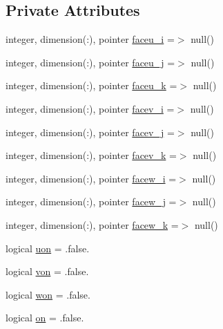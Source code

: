 \subsection*{Private Attributes}
\begin{DoxyCompactItemize}
\item 
integer, dimension(\+:), pointer \mbox{\hyperlink{structmodulehydrodynamic_1_1t__thinwalls_a0a7f7ad052a76885bd8609b41dea27d5}{faceu\+\_\+i}} =$>$ null()
\item 
integer, dimension(\+:), pointer \mbox{\hyperlink{structmodulehydrodynamic_1_1t__thinwalls_ae196e7ae2104e91f81df9984c74ae733}{faceu\+\_\+j}} =$>$ null()
\item 
integer, dimension(\+:), pointer \mbox{\hyperlink{structmodulehydrodynamic_1_1t__thinwalls_a2858acc4e056d5474ff44e85604df4b5}{faceu\+\_\+k}} =$>$ null()
\item 
integer, dimension(\+:), pointer \mbox{\hyperlink{structmodulehydrodynamic_1_1t__thinwalls_ae4cf7b842e83d0697fe416873188abc2}{facev\+\_\+i}} =$>$ null()
\item 
integer, dimension(\+:), pointer \mbox{\hyperlink{structmodulehydrodynamic_1_1t__thinwalls_a1d1ebabfde9afa856e89c6661426324e}{facev\+\_\+j}} =$>$ null()
\item 
integer, dimension(\+:), pointer \mbox{\hyperlink{structmodulehydrodynamic_1_1t__thinwalls_a7cef5ea62233775318f97cea1beacee3}{facev\+\_\+k}} =$>$ null()
\item 
integer, dimension(\+:), pointer \mbox{\hyperlink{structmodulehydrodynamic_1_1t__thinwalls_ad85dda7a89768263cdc8e4a7061e4844}{facew\+\_\+i}} =$>$ null()
\item 
integer, dimension(\+:), pointer \mbox{\hyperlink{structmodulehydrodynamic_1_1t__thinwalls_a0adaaffe9d6bf39c11bf4815288a2e81}{facew\+\_\+j}} =$>$ null()
\item 
integer, dimension(\+:), pointer \mbox{\hyperlink{structmodulehydrodynamic_1_1t__thinwalls_a607ddaff2e50ed5d26175f83ecf3dc6b}{facew\+\_\+k}} =$>$ null()
\item 
logical \mbox{\hyperlink{structmodulehydrodynamic_1_1t__thinwalls_a8d8a50223814ecf27237f9c085605ad9}{uon}} = .false.
\item 
logical \mbox{\hyperlink{structmodulehydrodynamic_1_1t__thinwalls_a3d3554b49a5735ca105cb9e8e6a41847}{von}} = .false.
\item 
logical \mbox{\hyperlink{structmodulehydrodynamic_1_1t__thinwalls_a4a20d8f75b9d24a3e3c83120290c5479}{won}} = .false.
\item 
logical \mbox{\hyperlink{structmodulehydrodynamic_1_1t__thinwalls_a9c8c5e6e1b9e0be5153067ca128ed426}{on}} = .false.

\end{DoxyCompactItemize}
